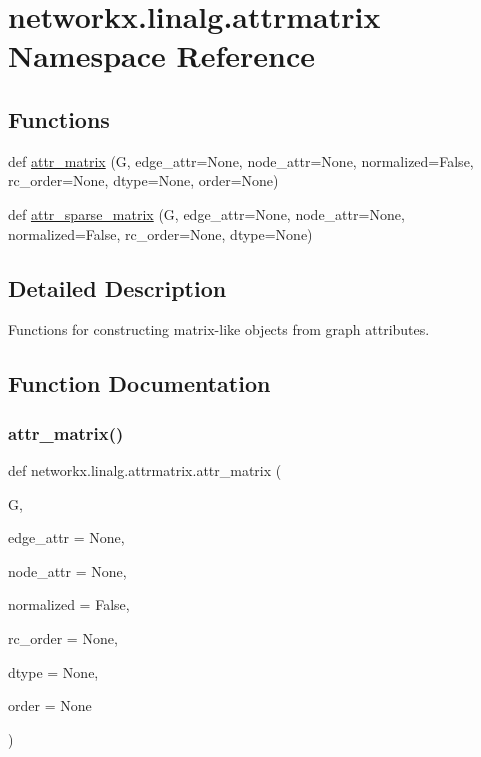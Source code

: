 \hypertarget{namespacenetworkx_1_1linalg_1_1attrmatrix}{}\section{networkx.\+linalg.\+attrmatrix Namespace Reference}
\label{namespacenetworkx_1_1linalg_1_1attrmatrix}
\subsection*{Functions}
\begin{DoxyCompactItemize}
\item 
def \hyperlink{namespacenetworkx_1_1linalg_1_1attrmatrix_a52e13d7872df0c1e5d890f9c689704a2}{attr\+\_\+matrix} (G, edge\+\_\+attr=None, node\+\_\+attr=None, normalized=False, rc\+\_\+order=None, dtype=None, order=None)
\item 
def \hyperlink{namespacenetworkx_1_1linalg_1_1attrmatrix_aad30696466f0e0e645fe36412a9bd171}{attr\+\_\+sparse\+\_\+matrix} (G, edge\+\_\+attr=None, node\+\_\+attr=None, normalized=False, rc\+\_\+order=None, dtype=None)
\end{DoxyCompactItemize}


\subsection{Detailed Description}
\begin{DoxyVerb}    Functions for constructing matrix-like objects from graph attributes.
\end{DoxyVerb}
 

\subsection{Function Documentation}
\mbox{\label{namespacenetworkx_1_1linalg_1_1attrmatrix_a52e13d7872df0c1e5d890f9c689704a2}} 
\subsubsection{\texorpdfstring{attr\+\_\+matrix()}{attr\_matrix()}}
{\footnotesize\ttfamily def networkx.\+linalg.\+attrmatrix.\+attr\+\_\+matrix (\begin{DoxyParamCaption}\item[{}]{G,  }\item[{}]{edge\+\_\+attr = {\ttfamily None},  }\item[{}]{node\+\_\+attr = {\ttfamily None},  }\item[{}]{normalized = {\ttfamily False},  }\item[{}]{rc\+\_\+order = {\ttfamily None},  }\item[{}]{dtype = {\ttfamily None},  }\item[{}]{order = {\ttfamily None} }\end{DoxyParamCaption})}

